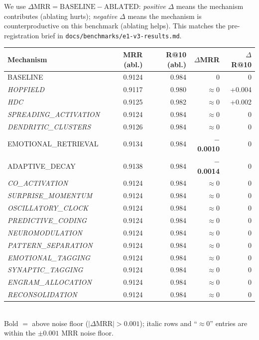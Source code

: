 \documentclass[11pt]{article}
\begin{document}
We use $\Delta\text{MRR} = \text{BASELINE} - \text{ABLATED}$:
\emph{positive} $\Delta$ means the mechanism contributes (ablating
hurts); \emph{negative} $\Delta$ means the mechanism is
counterproductive on this benchmark (ablating helps).  This matches
the pre-registration brief in \texttt{docs/benchmarks/e1-v3-results.md}.

\begin{center}
\small
\begin{tabular}{lrrrr}
\toprule
Mechanism            & MRR (abl.) & R@10 (abl.) & $\Delta$MRR & $\Delta$R@10 \\
\midrule
BASELINE              & 0.9124 & 0.984 & 0       & 0      \\
\emph{HOPFIELD}              & 0.9117 & 0.980 & $\approx 0$ & +0.004 \\
\emph{HDC}                   & 0.9125 & 0.982 & $\approx 0$ & +0.002 \\
\emph{SPREADING\_ACTIVATION} & 0.9124 & 0.984 & $\approx 0$ & 0      \\
\emph{DENDRITIC\_CLUSTERS}   & 0.9126 & 0.984 & $\approx 0$ & 0      \\
EMOTIONAL\_RETRIEVAL  & 0.9134 & 0.984 & \textbf{$-$0.0010} & 0      \\
ADAPTIVE\_DECAY       & 0.9138 & 0.984 & \textbf{$-$0.0014} & 0      \\
\emph{CO\_ACTIVATION}        & 0.9124 & 0.984 & $\approx 0$ & 0      \\
\emph{SURPRISE\_MOMENTUM}    & 0.9124 & 0.984 & $\approx 0$ & 0      \\
\emph{OSCILLATORY\_CLOCK}    & 0.9124 & 0.984 & $\approx 0$ & 0      \\
\emph{PREDICTIVE\_CODING}    & 0.9124 & 0.984 & $\approx 0$ & 0      \\
\emph{NEUROMODULATION}       & 0.9124 & 0.984 & $\approx 0$ & 0      \\
\emph{PATTERN\_SEPARATION}   & 0.9124 & 0.984 & $\approx 0$ & 0      \\
\emph{EMOTIONAL\_TAGGING}    & 0.9124 & 0.984 & $\approx 0$ & 0      \\
\emph{SYNAPTIC\_TAGGING}     & 0.9124 & 0.984 & $\approx 0$ & 0      \\
\emph{ENGRAM\_ALLOCATION}    & 0.9124 & 0.984 & $\approx 0$ & 0      \\
\emph{RECONSOLIDATION}       & 0.9124 & 0.984 & $\approx 0$ & 0      \\
\bottomrule
\end{tabular}\\[2pt]
{\footnotesize Bold $=$ above noise floor ($|\Delta\text{MRR}| >
0.001$); italic rows and ``$\approx 0$'' entries are within the
$\pm 0.001$ MRR noise floor.}
\end{center}
\end{document}
